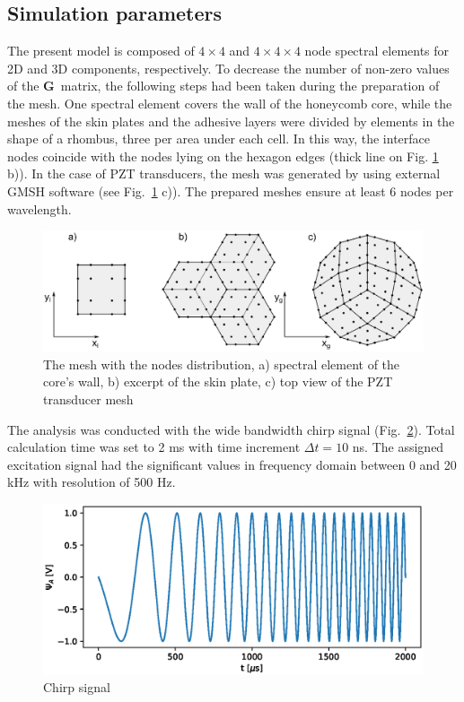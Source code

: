 \documentclass[materials,article,submit,moreauthors,pdftex]{Definitions/mdpi}
\begin{document}
{\subsection{Simulation parameters}
\label{sec:simulation}
The present model is composed of \(4 \times 4\) and \(4 \times 4 \times 4\) node spectral elements for 2D and 3D components, respectively.
To decrease the number of non-zero values of the \(\textbf{G}\)~matrix, the following steps had been taken during the preparation of the mesh.
One spectral element covers the wall of the honeycomb core, while the meshes of the skin plates and the adhesive layers were divided by elements in the shape of a rhombus, three per area under each cell.
In this way, the interface nodes coincide with the nodes lying on the hexagon edges (thick line on Fig. \ref{fig:skin_mesh} b)).
In the case of PZT transducers, the mesh was generated by using external GMSH software \cite{geuzaine2009gmsh} (see Fig.~\ref{fig:skin_mesh} c)).
The prepared meshes ensure at least 6 nodes per wavelength.
\begin{figure}
	\begin{center}
		\includegraphics[width=1\linewidth]{../../figures/eps/skin_mesh.eps}
	\end{center}
	\caption{The mesh with the nodes distribution, a) spectral element of the core's wall, b) excerpt of the skin plate, c) top view of the PZT transducer mesh}
	\label{fig:skin_mesh}
\end{figure}
The analysis was conducted with the wide bandwidth chirp signal (Fig.~\ref{fig:chirp}).
Total calculation time was set to 2 ms with time increment \(\Delta t=10\) ns.
The assigned excitation signal had the significant values in frequency domain between 0 and 20 kHz with resolution of 500 Hz.
\begin{figure}
	\begin{center}
		\includegraphics[width=1\linewidth]{../../figures/eps/chirp_0_20.eps}
	\end{center}
	\caption{Chirp signal}
	\label{fig:chirp}
\end{figure}
}
\end{document}
